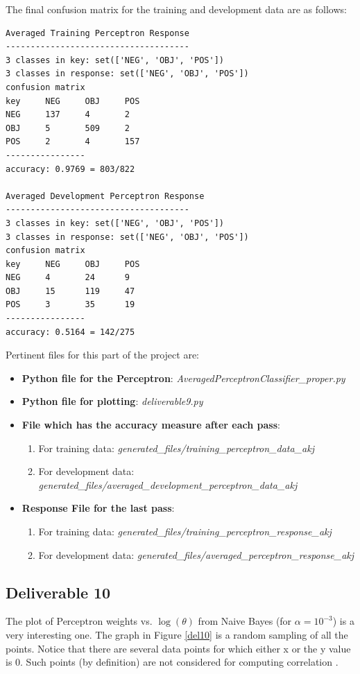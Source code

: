 \documentclass[10pt, letter]{article}
\begin{document}
The final confusion matrix for the training and development data are as follows:
\begin{verbatim}
Averaged Training Perceptron Response
-------------------------------------
3 classes in key: set(['NEG', 'OBJ', 'POS'])
3 classes in response: set(['NEG', 'OBJ', 'POS'])
confusion matrix
key     NEG     OBJ     POS
NEG     137     4       2
OBJ     5       509     2
POS     2       4       157
----------------
accuracy: 0.9769 = 803/822

Averaged Development Perceptron Response
-------------------------------------
3 classes in key: set(['NEG', 'OBJ', 'POS'])
3 classes in response: set(['NEG', 'OBJ', 'POS'])
confusion matrix
key     NEG     OBJ     POS
NEG     4       24      9
OBJ     15      119     47
POS     3       35      19
----------------
accuracy: 0.5164 = 142/275

\end{verbatim}
Pertinent files for this part of the project are:
\begin{itemize}
	\item \textbf{Python file for the Perceptron}: \textit{AveragedPerceptronClassifier\_proper.py}
	\item \textbf{Python file for plotting}: \textit{deliverable9.py}
	\item \textbf{File which has the accuracy measure after each pass}: 
		\begin{enumerate}
			\item For training data: \textit{generated\_files/training\_perceptron\_data\_akj}
			\item For development data: \textit{generated\_files/averaged\_development\_perceptron\_data\_akj}
		\end{enumerate}
	\item \textbf{Response File for the last pass}: 
	\begin{enumerate}
			\item For training data: \textit{generated\_files/training\_perceptron\_response\_akj}
			\item For development data: \textit{generated\_files/averaged\_perceptron\_response\_akj}
		\end{enumerate}
\end{itemize}

\subsection*{Deliverable 10}
The plot of Perceptron weights vs. $\log(\theta)$ from Naive Bayes (for $\alpha = 10^{-3}$) is a very interesting one. The graph in Figure \ref{del10} is a random sampling of all the points. Notice that there are several data points for which either x or the y value is 0. Such points (by definition) are not considered for computing correlation \cite{scipy}.
\end{document}
